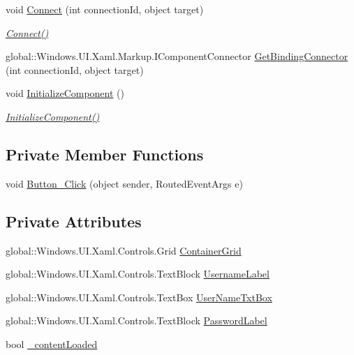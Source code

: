 \begin{DoxyCompactItemize}
void \hyperlink{class_eli_log_in_app_1_1_credentials_view_a0a2179d420f12bec24a13d3f35da3b8a}{Connect} (int connection\+Id, object target)
\begin{DoxyCompactList}\small\item\em \hyperlink{class_eli_log_in_app_1_1_credentials_view_a0a2179d420f12bec24a13d3f35da3b8a}{Connect()} \end{DoxyCompactList}\item 
global\+::\+Windows.\+U\+I.\+Xaml.\+Markup.\+I\+Component\+Connector \hyperlink{class_eli_log_in_app_1_1_credentials_view_a0811c4d1e956579661dc0d1fb64856e8}{Get\+Binding\+Connector} (int connection\+Id, object target)
\item 
void \hyperlink{class_eli_log_in_app_1_1_credentials_view_a8a76b925bb31dbb8edff4dade82d7e44}{Initialize\+Component} ()
\begin{DoxyCompactList}\small\item\em \hyperlink{class_eli_log_in_app_1_1_credentials_view_a8a76b925bb31dbb8edff4dade82d7e44}{Initialize\+Component()} \end{DoxyCompactList}\end{DoxyCompactItemize}
\subsection*{Private Member Functions}
\begin{DoxyCompactItemize}
\item 
void \hyperlink{class_eli_log_in_app_1_1_credentials_view_a5448995d085a1e982dd1926f46084cbb}{Button\+\_\+\+Click} (object sender, Routed\+Event\+Args e)
\end{DoxyCompactItemize}
\subsection*{Private Attributes}
\begin{DoxyCompactItemize}
\item 
global\+::\+Windows.\+U\+I.\+Xaml.\+Controls.\+Grid \hyperlink{class_eli_log_in_app_1_1_credentials_view_a669f0c23d9107acadc26bb968a83de16}{Container\+Grid}
\item 
global\+::\+Windows.\+U\+I.\+Xaml.\+Controls.\+Text\+Block \hyperlink{class_eli_log_in_app_1_1_credentials_view_a49a4623c920bb5bb09bf42e1a3844b05}{Username\+Label}
\item 
global\+::\+Windows.\+U\+I.\+Xaml.\+Controls.\+Text\+Box \hyperlink{class_eli_log_in_app_1_1_credentials_view_a4fdec80902af75da80b195dcdcf54564}{User\+Name\+Txt\+Box}
\item 
global\+::\+Windows.\+U\+I.\+Xaml.\+Controls.\+Text\+Block \hyperlink{class_eli_log_in_app_1_1_credentials_view_aaf1ab2359e902792657e7b93153a63f0}{Password\+Label}
\item 
bool \hyperlink{class_eli_log_in_app_1_1_credentials_view_a3dcc15e010225ad11ef04773902f4657}{\+\_\+content\+Loaded}
\end{DoxyCompactItemize}


